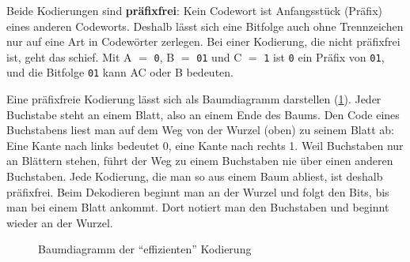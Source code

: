 Beide Kodierungen sind \textbf{präfixfrei}: Kein Codewort ist Anfangsstück (Präfix) eines anderen Codeworts. Deshalb lässt sich eine Bitfolge auch ohne Trennzeichen nur auf eine Art in Codewörter zerlegen. Bei einer Kodierung, die nicht präfixfrei ist, geht das schief. Mit A $=$ \texttt{0}, B $=$ \texttt{01} und C $=$ \texttt{1} ist \texttt{0} ein Präfix von \texttt{01}, und die Bitfolge \texttt{01} kann AC oder B bedeuten.

Eine präfixfreie Kodierung lässt sich als Baumdiagramm darstellen (\cref{fig:baum-effizient}). Jeder Buchstabe steht an einem Blatt, also an einem Ende des Baums. Den Code eines Buchstabens liest man auf dem Weg von der Wurzel (oben) zu seinem Blatt ab: Eine Kante nach links bedeutet 0, eine Kante nach rechts 1. Weil Buchstaben nur an Blättern stehen, führt der Weg zu einem Buchstaben nie über einen anderen Buchstaben. Jede Kodierung, die man so aus einem Baum abliest, ist deshalb präfixfrei. Beim Dekodieren beginnt man an der Wurzel und folgt den Bits, bis man bei einem Blatt ankommt. Dort notiert man den Buchstaben und beginnt wieder an der Wurzel.

\begin{figure}[H]
	\centering
	\caption{Baumdiagramm der \enquote{effizienten} Kodierung}
	\label{fig:baum-effizient}
\end{figure}

